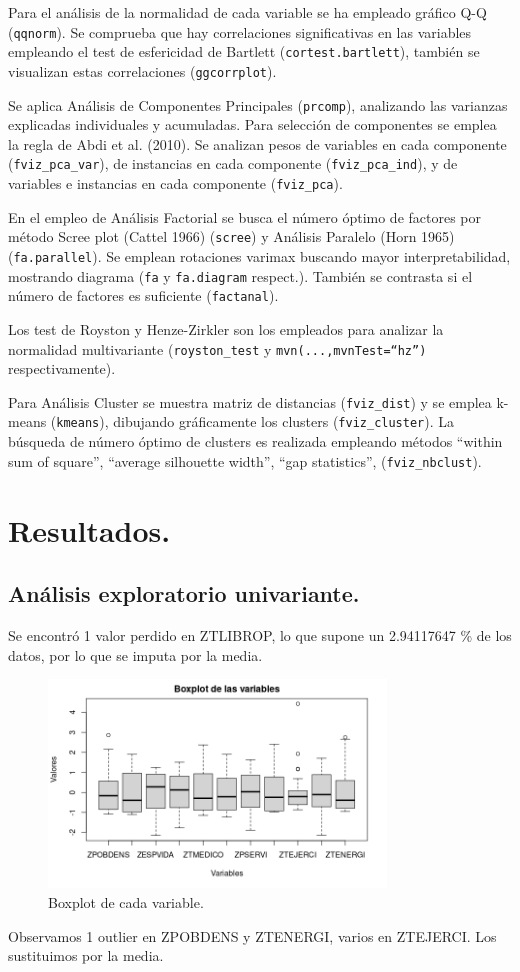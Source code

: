 \documentclass[11pt,a4paper]{article}
\begin{document}
	Para el análisis de la normalidad de cada variable se ha empleado gráfico Q-Q (\texttt{qqnorm}). Se comprueba que hay correlaciones significativas en las variables empleando el test de esfericidad de Bartlett (\texttt{cortest.bartlett}), también se visualizan estas correlaciones (\texttt{ggcorrplot}). 
	
	Se aplica Análisis de Componentes Principales (\texttt{prcomp}), analizando las varianzas explicadas individuales y acumuladas. Para selección de componentes se emplea la regla de Abdi et al. (2010). Se analizan pesos de variables en cada componente (\texttt{fviz\_pca\_var}), de instancias en cada componente (\texttt{fviz\_pca\_ind}), y de variables e instancias en cada componente (\texttt{fviz\_pca}).

	En el empleo de Análisis Factorial se busca el número óptimo de factores por método Scree plot (Cattel 1966) (\texttt{scree}) y Análisis Paralelo (Horn 1965) (\texttt{fa.parallel}). Se emplean rotaciones varimax buscando mayor interpretabilidad, mostrando diagrama (\texttt{fa} y \texttt{fa.diagram} respect.). También se contrasta si el número de factores es suficiente (\texttt{factanal}).
	
	Los test de Royston y Henze-Zirkler son los empleados para analizar la normalidad multivariante (\texttt{royston\_test} y \texttt{mvn(...,mvnTest=``hz'')} respectivamente).
	
	Para Análisis Cluster se muestra matriz de distancias (\texttt{fviz\_dist}) y se emplea k-means (\texttt{kmeans}), dibujando gráficamente los clusters (\texttt{fviz\_cluster}). La búsqueda de número óptimo de clusters es realizada empleando métodos ``within sum of square'', ``average silhouette width'', ``gap statistics'', (\texttt{fviz\_nbclust}).
    \section{Resultados.}
    \subsection{Análisis exploratorio univariante.}
    Se encontró 1 valor perdido en ZTLIBROP, lo que supone un 2.94117647 \% de los datos, por lo que se imputa por la media. 
    
    \begin{figure}[H]
		\centering
		\includegraphics[width=0.8\textwidth]{images/boxplot_uni}
		\caption{Boxplot de cada variable.}
	\end{figure}
	Observamos 1 outlier en ZPOBDENS y ZTENERGI, varios en ZTEJERCI. Los sustituimos por la media.
	
\end{document}
